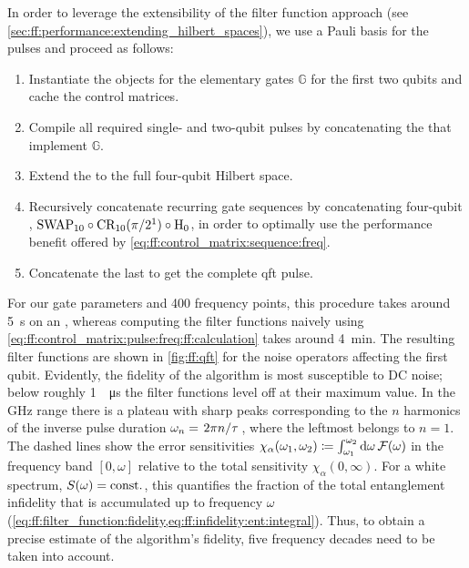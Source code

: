In order to leverage the extensibility of the filter function approach (see \cref{sec:ff:performance:extending_hilbert_spaces}), we use a Pauli basis for the pulses and proceed as follows:
\begin{enumerate}
    \item Instantiate the \pulsesequence objects for the elementary gates $\mathbb{G}$ for the first two qubits and cache the control matrices.
    \item Compile all required single- and two-qubit pulses by concatenating the \pulsesequences that implement $\mathbb{G}$.
    \item Extend the \pulsesequences to the full four-qubit Hilbert space.
    \item Recursively concatenate recurring gate sequences by concatenating four-qubit \pulsesequences, \eg $\mathrm{SWAP}_{10}\circ\mathrm{CR_{10}}(\pi/2^1)\circ\mathrm{H}_0$, in order to optimally use the performance benefit offered by \cref{eq:ff:control_matrix:sequence:freq}.
    \item Concatenate the last \pulsesequences to get the complete \gls{qft} pulse.
\end{enumerate}
For our gate parameters and \num{400} frequency points, this procedure takes around \qty{5}{\second} on an \fastprocessor, whereas computing the filter functions naively using \cref{eq:ff:control_matrix:pulse:freq:ff:calculation} takes around \qty{4}{\minute}.
The resulting filter functions are shown in \cref{fig:ff:qft} for the noise operators affecting the first qubit.
Evidently, the fidelity of the algorithm is most susceptible to DC noise; below roughly \qty{1}{\per\micro\second} the filter functions level off at their maximum value.
In the \unit{\giga\hertz} range there is a plateau with sharp peaks corresponding to the $n$ harmonics of the inverse pulse duration $\omega_n = \flatfrac{2\pi n}{\tau}$, where the leftmost belongs to $n=1$.
The dashed lines show the error sensitivities $\chi_\alpha(\omega_1, \omega_2)\coloneqq\int_{\omega_1}^{\omega_2}\dd{\omega}\mathcal{F}(\omega)$ in the frequency band $[0, \omega]$ relative to the total sensitivity $\chi_\alpha(0,\infty)$.
For a white spectrum, \ie $S(\omega)=\mathrm{const.}$, this quantifies the fraction of the total entanglement infidelity that is accumulated up to frequency $\omega$ (\cf \cref{eq:ff:filter_function:fidelity,eq:ff:infidelity:ent:integral}).
Thus, to obtain a precise estimate of the algorithm's fidelity, five frequency decades need to be taken into account.

